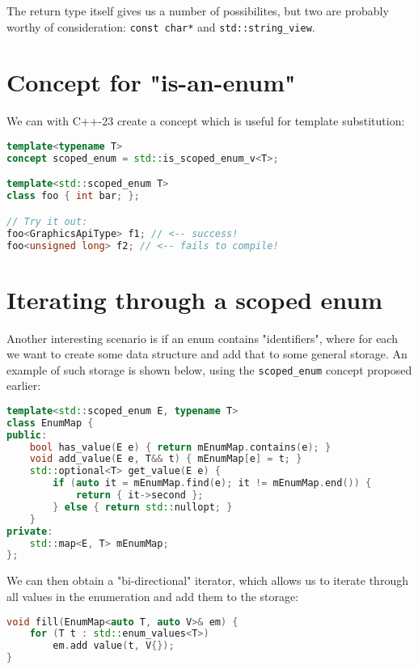 \documentclass[
  format=manuscript,
  screen=true,
  review=false,
  nonacm=true,
  timestamp=true,
  balance=false]{acmart}
\begin{document}
\noindent
The return type itself gives us a number of possibilites, but two are probably worthy
of consideration: \texttt{const char*} and \texttt{std::string\_view}.

\section{Concept for "is-an-enum"}

We can with C++-23 create a concept which is useful for template substitution:\vspace{2mm}

\begin{lstlisting}[language=Cpp]
template<typename T>
concept scoped_enum = std::is_scoped_enum_v<T>;

template<std::scoped_enum T>
class foo { int bar; };

// Try it out:
foo<GraphicsApiType> f1; // <-- success!
foo<unsigned long> f2; // <-- fails to compile!
\end{lstlisting}

\section{Iterating through a scoped enum}

Another interesting scenario is if an enum contains "identifiers", where for each we
want to create some data structure and add that to some general storage. An example
of such storage is shown below, using the \texttt{scoped\_enum} concept proposed
earlier:\vspace{2mm}

\begin{lstlisting}[language=Cpp]
template<std::scoped_enum E, typename T>
class EnumMap {
public:
    bool has_value(E e) { return mEnumMap.contains(e); }
    void add_value(E e, T&& t) { mEnumMap[e] = t; }
    std::optional<T> get_value(E e) {
        if (auto it = mEnumMap.find(e); it != mEnumMap.end()) {
            return { it->second };
        } else { return std::nullopt; }
    }
private:
    std::map<E, T> mEnumMap;
};
\end{lstlisting}

We can then obtain a "bi-directional" iterator, which allows us to iterate through
all values in the enumeration and add them to the storage:\vspace{2mm}

\begin{lstlisting}[language=Cpp]
void fill(EnumMap<auto T, auto V>& em) {
    for (T t : std::enum_values<T>)
        em.add value(t, V{});
}
\end{lstlisting}
\end{document}
